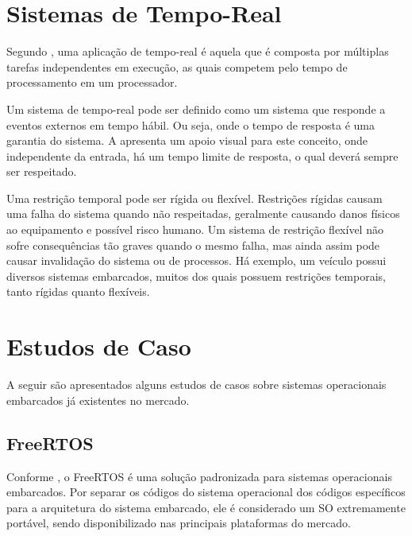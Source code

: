 
\section{Sistemas de Tempo-Real}

Segundo , uma aplicação de tempo-real é aquela que é composta por múltiplas tarefas independentes em execução, as quais competem pelo tempo de processamento em um processador.

Um sistema de tempo-real pode ser definido como um sistema que responde a eventos externos em tempo hábil. Ou seja, onde o tempo de resposta é uma garantia do sistema. A  apresenta um apoio visual para este conceito, onde independente da entrada, há um tempo limite de resposta, o qual deverá sempre ser respeitado.


Uma restrição temporal pode ser rígida ou flexível. Restrições rígidas causam uma falha do sistema quando não respeitadas, geralmente causando danos físicos ao equipamento e possível risco humano. Um sistema de restrição flexível não sofre consequências tão graves quando o mesmo falha, mas ainda assim pode causar invalidação do sistema ou de processos. Há exemplo, um veículo possui diversos sistemas embarcados, muitos dos quais possuem restrições temporais, tanto rígidas quanto flexíveis.

\section{Estudos de Caso}

A seguir são apresentados alguns estudos de casos sobre sistemas operacionais embarcados já existentes no mercado.

\subsection{FreeRTOS}

Conforme , o FreeRTOS é uma solução padronizada para sistemas operacionais embarcados. Por separar os códigos do sistema operacional dos códigos específicos para a arquitetura do sistema embarcado, ele é considerado um SO extremamente portável, sendo disponibilizado nas principais plataformas do mercado.

